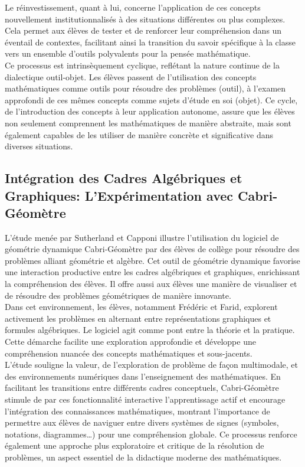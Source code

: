 Le réinvestissement,
quant à lui,
concerne l'application de ces concepts nouvellement institutionnalisés à des situations différentes ou plus complexes.
Cela permet aux élèves de tester et de renforcer leur compréhension dans un éventail de contextes,
facilitant ainsi la transition du savoir spécifique à la classe vers un ensemble d'outils polyvalents pour la pensée mathématique.\\

Ce processus est intrinsèquement cyclique,
reflétant la nature continue de la dialectique outil-objet.
Les élèves passent de l'utilisation des concepts mathématiques comme outils pour résoudre des problèmes (outil),
à l'examen approfondi de ces mêmes concepts comme sujets d'étude en soi (objet).
Ce cycle,
de l'introduction des concepts à leur application autonome,
assure que les élèves non seulement comprennent les mathématiques de manière abstraite,
mais sont également capables de les utiliser de manière concrète et significative dans diverses situations.

\subsection{Intégration des Cadres Algébriques et Graphiques: L'Expérimentation avec Cabri-Géomètre}

L'étude menée par Sutherland et Capponi illustre l'utilisation du logiciel de géométrie dynamique Cabri-Géomètre par des élèves de collège pour résoudre des problèmes alliant géométrie et algèbre.
Cet outil de géométrie dynamique favorise une interaction productive entre les cadres algébriques et graphiques,
enrichissant la compréhension des élèves.
Il offre aussi aux élèves une manière de visualiser et de résoudre des problèmes géométriques de manière innovante.\\

Dans cet environnement,
les élèves,
notamment Frédéric et Farid,
explorent activement les problèmes en alternant entre représentations graphiques et formules algébriques.
Le logiciel agit comme pont entre la théorie et la pratique.
Cette démarche facilite une exploration approfondie et développe une compréhension nuancée des concepts mathématiques et sous-jacents.\\

L'étude souligne la valeur,
de l'exploration de problème de façon multimodale,
et des environnements numériques dans l'enseignement des mathématiques.
En facilitant les transitions entre différents cadres conceptuels,
Cabri-Géomètre stimule de par ces fonctionnalité interactive l'apprentissage actif et encourage l'intégration des connaissances mathématiques,
montrant l'importance de permettre aux élèves de naviguer entre divers systèmes de signes (symboles, notations, diagrammes…) pour une compréhension globale.
Ce processus renforce également une approche plus exploratoire et critique de la résolution de problèmes,
un aspect essentiel de la didactique moderne des mathématiques.

